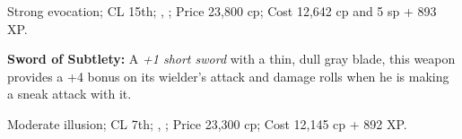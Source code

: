 Strong evocation; CL 15th; , ; Price 23,800 cp; Cost 12,642 cp and 5 sp + 893 XP.

\textbf{Sword of Subtlety:} A \emph{+1 short sword} with a thin, dull gray blade, this weapon provides a +4 bonus on its wielder's attack and damage rolls when he is making a sneak attack with it.

Moderate illusion; CL 7th; , ; Price 23,300 cp; Cost 12,145 cp + 892 XP.






